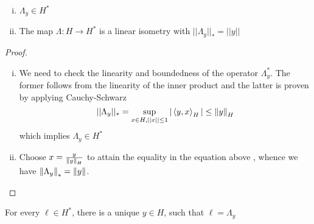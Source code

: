 \documentclass{article}
\begin{document}
\begin{lemma}
	\hfill
	\begin{enumerate}[i)]
		\item  \(\Lambda_y \in H^*\)
		\item The map  \(\Lambda: H \to H^*\) is a linear isometry with  \(||\Lambda_y||_{*}=||y||\)
	\end{enumerate}
\end{lemma}

\begin{proof}
	\begin{enumerate}[i)]
		\item We need to check the linearity and boundedness of the operator  \(\Lambda_y^*\). The former follows from the linearity of the inner product and the latter is proven by applying Cauchy-Schwarz
		      \begin{equation*}
			      ||\Lambda_y||_* = \sup_{x\in H, ||x|| \leq 1} |\left<{y},{x}\right>_H| \leq \left\|{y}\right\|_H
		      \end{equation*}
		      which implies  \(\Lambda_y \in H^*\)

		\item Choose  \(x = \frac{y}{\left\|{y}\right\|_H}\) to attain the equality in the equation above , whence we have  \(\left\|{\Lambda_y}\right\|_*=\left\|{y}\right\|\).
	\end{enumerate}
\end{proof}

\begin{theorem}
	 \nl
	\label{riesz representation}
	For every  \(\ell \in H^*\), there is a unique  \(y \in H\), such that  \(\ell=\Lambda_y\)
\end{theorem}
\end{document}
